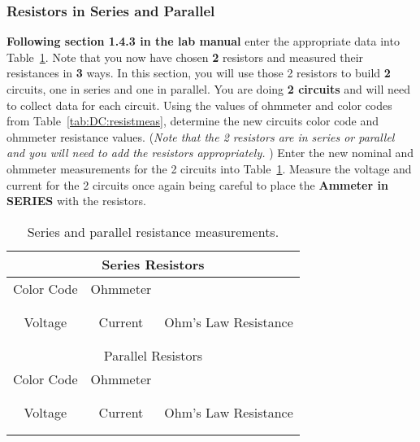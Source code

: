 \subsubsection{Resistors in Series and Parallel}

{\bf Following section 1.4.3 in the lab manual} enter the appropriate
data into Table~\ref{tab:DC:SeriesParallelRmeas}.  Note that you now have 
chosen {\bf 2} resistors
and measured their resistances in {\bf 3} ways. In this section, you will
use those 2 resistors to build {\bf 2} circuits, one in series and one in
parallel.  You are doing {\bf 2 circuits} and will need to collect data 
for each circuit.
Using the values of ohmmeter and color codes from
Table~\ref{tab:DC:resistmeas}, 
determine the new circuits color code and ohmmeter resistance values.
({\it Note that the 2 resistors are in series or parallel and you will 
need to add the resistors appropriately.  })     
Enter the new nominal and ohmmeter measurements for the 2 
circuits into Table~\ref{tab:DC:SeriesParallelRmeas}.  Measure the voltage and
current for the 2 circuits once again being careful to place the {\bf Ammeter
in SERIES} with the resistors. 

\begin{table}[htb]
\begin{center}
\begin{tabular}{|c|c|c|}
\hline
\multicolumn{3}{|c|}{Series Resistors} \\
\hline 
Color Code & Ohmmeter & \\ 
\hline
\hspace*{3cm} & \hspace*{3cm} & \hspace*{3cm} \\ 
& &  \\ 
\hline
Voltage & Current & Ohm's Law Resistance \\
\hline
& &  \\
& &  \\
\hline
\hline
\multicolumn{3}{|c|}{Parallel Resistors} \\
\hline 
Color Code & Ohmmeter & \\ 
\hline
\hspace*{3cm} & \hspace*{3cm} & \hspace*{3cm} \\ 
& &  \\ 
\hline
Voltage & Current & Ohm's Law Resistance \\
\hline
& &  \\
& &  \\
\hline
\end{tabular}
\end{center}
\caption{Series and parallel resistance measurements.}
\label{tab:DC:SeriesParallelRmeas}
\end{table}

